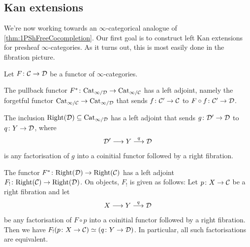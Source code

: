\subsection{Kan extensions}\label{subsec:KanExtensions}
We're now working towards an $\infty$-categorical analogue of \cref{thm:1PShFreeCocompletion}. %
Our first goal is to construct left Kan extensions for presheaf $\infty$-categories. As it turns out, this is most easily done in the fibration picture.
\begin{lem}\label{lem:KanExtensionForRight}
	Let $F\colon \mathcal{C}\rightarrow \mathcal{D}$ be a functor of $\infty$-categories.
	\begin{alphanumerate}
		\item \!The pullback functor $F^*\colon \mathrm{Cat}_{\infty/\mathcal{D}}\rightarrow\mathrm{Cat}_{\infty/\mathcal{C}}$ has a left adjoint, namely the forgetful functor $\mathrm{Cat}_{\infty/\mathcal{C}}\rightarrow\mathrm{Cat}_{\infty/\mathcal{D}}$ that sends $f\colon \mathcal{C}'\rightarrow \mathcal{C}$ to $F\circ f\colon \mathcal{C}'\rightarrow \mathcal{D}$.\label{enum:ForgetfulFunctor}
		\item \!The inclusion $\mathrm{Right}(\mathcal{D})\subseteq\mathrm{Cat}_{\infty/\mathcal{D}}$ has a left adjoint that sends $g\colon \mathcal{D}'\rightarrow \mathcal{D}$ to $q\colon Y\rightarrow \mathcal{D}$, where
		\begin{equation*}
			\mathcal{D}'\longrightarrow Y\overset{q}{\longrightarrow}\mathcal{D}
		\end{equation*}
		is any factorisation of $g$ into a coinitial functor followed by a right fibration.\label{enum:RightCofinalLeftAdjoint}
		\item \!The functor $F^*\colon \mathrm{Right}(\mathcal{D})\rightarrow \mathrm{Right}(\mathcal{C})$ has a left adjoint $F_!\colon \mathrm{Right}(\mathcal{C})\rightarrow \mathrm{Right}(\mathcal{D})$. On objects, $F_!$ is given as follows: Let $p\colon X\rightarrow \mathcal{C}$ be a right fibration and let\label{enum:RightPullbackLeftAdjoint}
		\begin{equation*}
			X\longrightarrow Y\overset{q}{\longrightarrow} \mathcal{D}
		\end{equation*}
		be any factorisation of $F\circ p$ into a coinitial functor followed by a right fibration. Then we have $F_!(p\colon X\rightarrow \mathcal{C})\simeq (q\colon Y\rightarrow \mathcal{D})$. In particular, all such factorisations are equivalent.
	\end{alphanumerate}
\end{lem}
